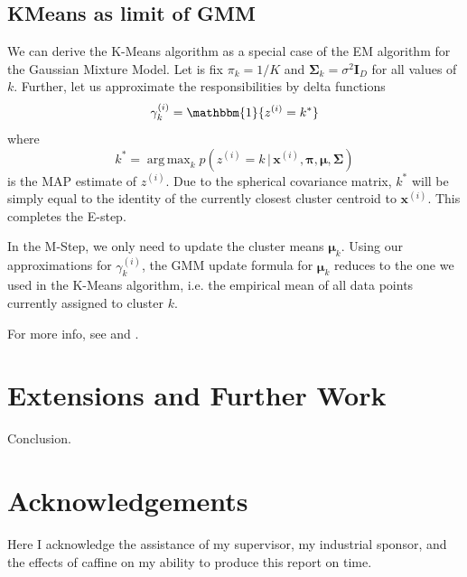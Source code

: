 \documentclass[final,3p,times,twocolumn]{elsarticle}
\DeclareMathOperator*{\argmax}{arg\,max}
\begin{document}
\subsection{KMeans as limit of GMM}
We can derive the K-Means algorithm as a special case of the EM algorithm for the Gaussian Mixture Model.
Let is fix $\pi_k = 1/K$ and $\boldsymbol \Sigma_k = \sigma^2 \boldsymbol I_D$ for all values of $k$.
Further, let us approximate the responsibilities by delta functions
\begin{equation}
\label{eqn:gmmdelta}
\gamma_k^{(i)} = \mathbbm{1}\{z^{(i)} = k^*\}
\end{equation}
where
\begin{equation}
k^* = \argmax_k p(z^{(i)} = k\,|\,\boldsymbol x^{(i)},\boldsymbol \pi, \boldsymbol \mu, \boldsymbol \Sigma)
\end{equation}
is the MAP estimate of $z^{(i)}$.
Due to the spherical covariance matrix, $k^*$ will be simply equal to the identity of the currently closest cluster centroid to $\boldsymbol x^{(i)}$. This completes the E-step.

In the M-Step, we only need to update the cluster means $\boldsymbol \mu_k$.
Using our approximations for $\gamma_k^{(i)}$, the GMM update formula for $\boldsymbol \mu_k$ reduces to the one we used in the K-Means algorithm, i.e. the empirical mean of all data points currently assigned to cluster $k$.

For more info, see \cite{Bishop} and \cite{Murphy}.

\section{Extensions and Further Work}
Conclusion.

\section*{Acknowledgements}
Here I acknowledge the assistance of my supervisor, my industrial sponsor,
and the effects of caffine on my ability to produce this report on time.

\appendix



\end{document}
